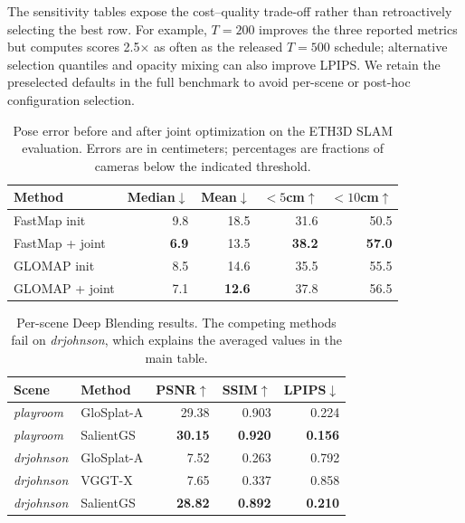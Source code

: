 \documentclass[sigconf]{acmart}
\begin{document}
The sensitivity tables expose the cost--quality trade-off rather than retroactively selecting the best row. For example, $T{=}200$ improves the three reported metrics but computes scores 2.5$\times$ as often as the released $T{=}500$ schedule; alternative selection quantiles and opacity mixing can also improve LPIPS. We retain the preselected defaults in the full benchmark to avoid per-scene or post-hoc configuration selection.

\begin{table}[t]
    \centering
    \footnotesize
    \caption{Pose error before and after joint optimization on the ETH3D SLAM evaluation. Errors are in centimeters; percentages are fractions of cameras below the indicated threshold.}
    \label{tab:supp_pose_errors}
    \begin{tabular}{lrrrr}
        \toprule
        Method & Median$\downarrow$ & Mean$\downarrow$ & $<5$cm$\uparrow$ & $<10$cm$\uparrow$ \\
        \midrule
        FastMap init & 9.8 & 18.5 & 31.6 & 50.5 \\
        FastMap + joint & \textbf{6.9} & 13.5 & \textbf{38.2} & \textbf{57.0} \\
        GLOMAP init & 8.5 & 14.6 & 35.5 & 55.5 \\
        GLOMAP + joint & 7.1 & \textbf{12.6} & 37.8 & 56.5 \\
        \bottomrule
    \end{tabular}
\end{table}

\begin{table}[t]
    \centering
    \footnotesize
    \caption{Per-scene Deep Blending results. The competing methods fail on \textit{drjohnson}, which explains the averaged values in the main table.}
    \label{tab:supp_deep_blending_split}
    \begin{tabular}{llrrr}
        \toprule
        Scene & Method & PSNR$\uparrow$ & SSIM$\uparrow$ & LPIPS$\downarrow$ \\
        \midrule
        \textit{playroom} & GloSplat-A & 29.38 & 0.903 & 0.224 \\
        \textit{playroom} & SalientGS & \textbf{30.15} & \textbf{0.920} & \textbf{0.156} \\
        \textit{drjohnson} & GloSplat-A & 7.52 & 0.263 & 0.792 \\
        \textit{drjohnson} & VGGT-X & 7.65 & 0.337 & 0.858 \\
        \textit{drjohnson} & SalientGS & \textbf{28.82} & \textbf{0.892} & \textbf{0.210} \\
        \bottomrule
    \end{tabular}
\end{table}
\end{document}
